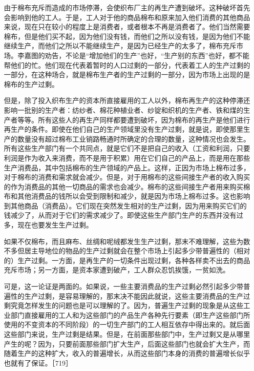 由于棉布充斥而造成的市场停滞，会使织布厂主的再生产遭到破坏。这种破坏首先会影响到他的工人。于是，工人对于他的商品棉布和原来加入他们消费的其他商品来说，现在只在较小的程度上是消费者，或者根本不再是消费者了。他们当然需要棉布，但是他们买不起，因为他们没有钱，而他们之所以没有钱，是因为他们不能继续生产，而他们之所以不能继续生产，是因为已经生产的太多了，棉布充斥市场。李嘉图的劝告，不论是“增加他们的生产”也好，“生产别的东西”也好，都不能帮他们的忙。他们现在代表着暂时的人口过剩的一部分，代表着工人的生产过剩的一部分，在这种场合，就是棉布生产者的生产过剩的一部分，因为市场上出现的是棉布的生产过剩。

但是，除了投入织布生产的资本所直接雇用的工人以外，棉布再生产的这种停滞还影响一批别的生产者：纺纱者、棉花种植业者、纱锭和织机的生产者、铁和煤的生产者等等。所有这些人的再生产同样都要遭到破坏，因为棉布的再生产是他们进行再生产的条件。即使在他们自己的生产领域里没有生产过剩，就是说，即使那里生产的数量没有超过棉布工业销路畅通时所确定的合理的数量，这种情况也会发生。所有这些生产部门有一个共同点，就是它们不是把自己的收入（工资和利润，只要利润是作为收入来消费，而不是用于积累）用在它们自己的产品上，而是用在那些生产消费品，其中包括棉布的生产领域的产品上。这样，正因为市场上棉布过多，对于棉布的消费和需求就会减少。但是，对于用棉布的这些间接生产者的收入购买的作为消费品的其他一切商品的需求也会减少。棉布的这些间接生产者用来购买棉布和其他消费品的钱所以会受到限制和减少，就是因为市场上棉布过多。这也影响到其他商品（消费品）。它们现在突然发生相对的生产过剩，因为用来购买它们的钱减少了，从而对于它们的需求减少了。即使这些生产部门生产的东西并没有过多，现在也要发生生产过剩。

如果不仅棉布，而且麻布、丝绸和呢绒都发生生产过剩，那末不难理解，这些为数不多但居主导地位的物品的生产过剩就会在整个市场上引起多少带普遍性的（相对的）生产过剩。一方面，是再生产的一切条件出现过剩，各种各样卖不出去的商品充斥市场；另一方面，是资本家遭到破产，工人群众忍饥挨饿，一贫如洗。

可是，这一论证是两面的。如果说，一些主要消费品的生产过剩必然引起多少带普遍性的生产过剩，是容易理解的，那末决不能因此就说，这些主要消费品的生产过剩究竟怎样发生的问题也是可以理解的了。因为，普遍生产过剩的现象是从这些工业部门直接雇用的工人和为这些部门的产品生产各种先行要素（即生产这些部门所使用的不变资本的不同阶段）的一切生产部门的工人相互依存中得出来的。就后面这些部门来说，生产过剩是结果。但是，在前面那些部门中，生产过剩又是从哪里产生的呢？因为，只要前面那些部门扩大生产，后面这些部门也就会扩大生产，而随着生产的这种扩大，收入的普遍增长，从而这些部门本身的消费的普遍增长似乎也就有了保证。［719］

